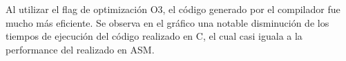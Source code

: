\documentclass[a4paper]{article}
\begin{document}
\begin{centering}
\end{centering}

Al utilizar el flag de optimización O3, el código generado
por el compilador fue mucho más eficiente. Se observa en el
gráfico una notable disminución de los tiempos de ejecución
del código realizado en C, el cual casi iguala a la performance
del realizado en ASM.


\begin{centering}
\end{centering}
\end{document}
